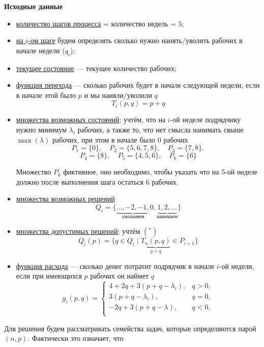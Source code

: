 \textbf{Исходные данные}
\begin{itemize}[nosep]
	\item \underline{количество шагов процесса} = количество недель = $5$;
	
	\item \underline{на $i$-ом шаге} будем определять сколько нужно нанять/уволить рабочих в начале недели ($q_i$);
	
	\item \underline{текущее состояние} --- текущее количество рабочих;
	
	\item \underline{функция перехода} --- сколько рабочих будет в начале следующей недели, если в начале этой было $p$ и мы наняли/уволили $q$
	\[T_i(p, q) = p + q\]
	
	\item \underline{множества возможных состояний}; учтём, что на $i$-ой неделе подрядчику нужно минимум $\lambda_i$ рабочих, а также то, что нет смысла нанимать свыше $\max (\lambda)$ рабочих, при этом в начале было 0 рабочих
	\[
	P_1 = \{0\}, \quad P_2 = \{5, 6, 7, 8\}, \quad P_3 = \{7, 8\},
	\]
	\[
	P_4 = \{8\}, \quad P_5 = \{4, 5, 6\}, \quad P_6 = \{6\}
	\]
	
	Множество $P_6$ фиктивное, оно необходимо, чтобы указать что на 5-ой неделе должно после выполнения шага остаться 6 рабочих.
	
	\item \underline{множества возможных решений}
	\[
	Q_i = \{\underbrace{\dots, -2, -1,}_{\text{увольняем}} 0, \underbrace{1, 2, \dots}_{\text{нанимаем}}\}
	\]
	
	\item \underline{множества допустимых решений}; учтём $(^*)$
	\[Q_i(p) = \{q \in Q_i \; \big| \; \underbrace{T_n(p, q)}_{p + q} \in P_{i + 1} \}\]
	
	\item \underline{функция расхода} --- сколько денег потратит подрядчик в начале $i$-ой недели, если при имеющихся $p$ рабочих он наймет $q$
	\[g_i(p,q) = \begin{cases}
		4 + 2q + 3(p + q - \lambda_i),& q > 0, \\
		3(p + q - \lambda_i),& q = 0, \\
		-2q + 3(p + q - \lambda),& q < 0. \\
	\end{cases}\]
\end{itemize}

Для решения будем рассматривать семейства задач, которые определяются парой $(n, p)$. Фактически это означает, что

